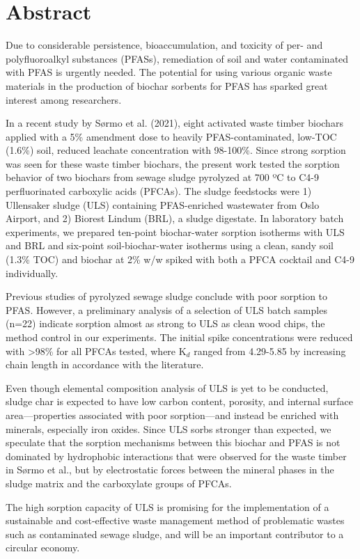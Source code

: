 \newpage
{}
\section*{Abstract}

Due to considerable persistence, bioaccumulation, and toxicity of per- and polyfluoroalkyl substances (PFASs), remediation of soil and water contaminated with PFAS is urgently needed. The potential for using various organic waste materials in the production of biochar sorbents for PFAS has sparked great interest among researchers.

In a recent study by S\o rmo et al. (2021), eight activated waste timber biochars applied with a 5\% amendment dose to heavily PFAS-contaminated, low-TOC (1.6\%) soil, reduced leachate concentration with 98-100\%. Since strong sorption was seen for these waste timber biochars, the present work tested the sorption behavior of two biochars from sewage sludge pyrolyzed at 700 ºC to C4-9 perfluorinated carboxylic acids (PFCAs). The sludge feedstocks were 1) Ullensaker sludge (ULS) containing PFAS-enriched wastewater from Oslo Airport, and 2) Biorest Lindum (BRL), a sludge digestate. In laboratory batch experiments, we prepared ten-point biochar-water sorption isotherms with ULS and BRL and six-point soil-biochar-water isotherms using a clean, sandy soil (1.3\% TOC) and biochar at 2\% w/w spiked with both a PFCA cocktail and C4-9 individually. 

Previous studies of pyrolyzed sewage sludge conclude with poor sorption to PFAS. However, a preliminary analysis of a selection of ULS batch samples (n=22) indicate sorption almost as strong to ULS as clean wood chips, the method control in our experiments. The initial spike concentrations were reduced with >98\% for all PFCAs tested, where K$_d$ ranged from 4.29-5.85 by increasing chain length in accordance with the literature. 

Even though elemental composition analysis of ULS is yet to be conducted, sludge char is expected to have low carbon content, porosity, and internal surface area—properties associated with poor sorption—and instead be enriched with minerals, especially iron oxides. Since ULS sorbs stronger than expected, we speculate that the sorption mechanisms between this biochar and PFAS is not dominated by hydrophobic interactions that were observed for the waste timber in S\o rmo et al., but by electrostatic forces between the mineral phases in the sludge matrix and the carboxylate groups of PFCAs.

The high sorption capacity of ULS is promising for the implementation of a sustainable and cost-effective waste management method of problematic wastes such as contaminated sewage sludge, and will be an important contributor to a circular economy. 










